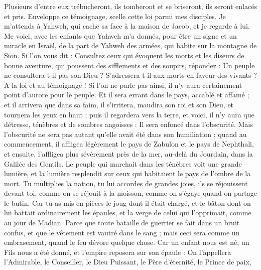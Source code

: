 \begin{multicols}{2}
Plusieurs d'entre eux trébucheront, ils tomberont et se briseront, ils seront enlacés et pris.
Enveloppe ce témoignage, scelle cette loi parmi mes disciples.
Je m'attends à Yahweh, qui cache sa face à la maison de Jacob, et je regarde à lui.
Me voici, avec les enfants que Yahweh m'a donnés, pour être un signe et un miracle en Israël, de la part de Yahweh des armées, qui habite sur la montagne de Sion.
Si l'on vous dit : Consultez ceux qui évoquent les morts et les diseurs de bonne aventure, qui poussent des sifflements et des soupirs, répondez : Un peuple ne consultera-t-il pas son Dieu ? S'adressera-t-il aux morts en faveur des vivants ?
A la loi et au témoignage ! Si l'on ne parle pas ainsi, il n'y aura certainement point d'aurore pour le peuple.
Et il sera errant dans le pays, accablé et affamé ; et il arrivera que dans sa faim, il s'irritera, maudira son roi et son Dieu, et tournera les yeux en haut ;
puis il regardera vers la terre, et voici, il n'y aura que détresse, ténèbres et de sombres angoisses : Il sera enfoncé dans l'obscurité.
Mais l'obscurité ne sera pas autant qu'elle avait été dans son humiliation ; quand au commencement, il affligea légèrement le pays de Zabulon et le pays de Nephthali, et ensuite, l'affligea plus sévèrement près de la mer, au-delà du Jourdain, dans la Galilée des Gentils.
\VerseOne{}Le peuple qui marchait dans les ténèbres voit une grande lumière, et la lumière resplendit sur ceux qui habitaient le pays de l'ombre de la mort.
Tu multiplies la nation, tu lui accordes de grandes joies, ils se réjouissent devant toi, comme on se réjouit à la moisson, comme on s'égaye quand on partage le butin.
Car tu as mis en pièces le joug dont il était chargé, et le bâton dont on lui battait ordinairement les épaules, et la verge de celui qui l'opprimait, comme au jour de Madian.
Parce que toute bataille de guerrier se fait dans un bruit confus, et que le vêtement est vautré dans le sang ; mais ceci sera comme un embrasement, quand le feu dévore quelque chose.
Car un enfant nous est né, un Fils nous a été donné, et l'empire reposera sur son épaule : On l'appellera l'Admirable, le Conseiller, le Dieu Puissant, le Père d'éternité, le Prince de paix,

\end{multicols}
